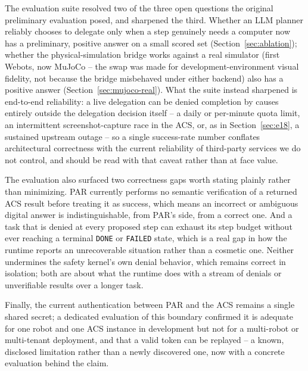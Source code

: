\documentclass[conference]{IEEEtran}
\begin{document}
The evaluation suite resolved two of the three open questions the original preliminary evaluation posed, and
sharpened the third. Whether an LLM planner reliably chooses to delegate only when a step genuinely needs
a computer now has a preliminary, positive answer on a small scored set (Section~\ref{sec:ablation}); whether
the physical-simulation bridge works against a real simulator (first Webots, now MuJoCo -- the swap was
made for development-environment visual fidelity, not because the bridge misbehaved under either backend)
also has a positive answer (Section~\ref{sec:mujoco-real}). What the suite instead sharpened is end-to-end
reliability: a live delegation can be denied
completion by causes entirely outside the delegation decision itself -- a daily or per-minute quota limit, an
intermittent screenshot-capture race in the ACS, or, as in Section~\ref{sec:e18}, a sustained upstream outage -- so a
single success-rate number conflates architectural correctness with the current reliability of third-party
services we do not control, and should be read with that caveat rather than at face value.

The evaluation also surfaced two correctness gaps worth stating plainly rather than minimizing. PAR
currently performs no semantic verification of a returned ACS result before treating it as success, which
means an incorrect or ambiguous digital answer is indistinguishable, from PAR's side, from a correct one.
And a task that is denied at every proposed step can exhaust its step budget without ever reaching a
terminal \texttt{DONE} or \texttt{FAILED} state, which is a real gap in how the runtime reports an unrecoverable
situation rather than a cosmetic one. Neither undermines the safety kernel's own denial behavior, which
remains correct in isolation; both are about what the runtime does with a stream of denials or unverifiable
results over a longer task.

Finally, the current authentication between PAR and the ACS remains a single shared secret; a dedicated
evaluation of this boundary confirmed it is adequate for one robot and one ACS instance in development but
not for a multi-robot or multi-tenant deployment, and that a valid token can be replayed -- a known,
disclosed limitation rather than a newly discovered one, now with a concrete evaluation behind the claim.
\end{document}
